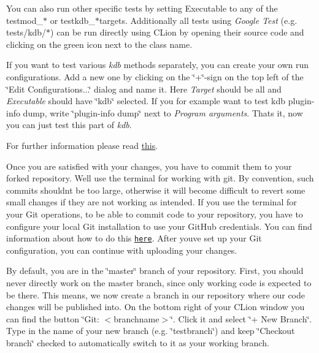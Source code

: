 You can also run other specific tests by setting {\ttfamily Executable} to any of the {\ttfamily testmod\+\_\+$\ast$} or {\ttfamily testkdb\+\_\+$\ast$}targets. Additionally all tests using {\itshape Google Test} (e.\+g. tests/kdb/$\ast$) can be run directly using C\+Lion by opening their source code and clicking on the green icon next to the class name.

If you want to test various {\itshape kdb} methods separately, you can create your own run configurations. Add a new one by clicking on the \char`\"{}+\char`\"{}-\/sign on the top left of the \char`\"{}\+Edit Configurations...\char`\"{} dialog and name it. Here {\itshape Target} should be {\ttfamily all} and {\itshape Executable} should have \char`\"{}kdb\char`\"{} selected. If you for example want to test {\ttfamily kdb plugin-\/info dump}, write \char`\"{}plugin-\/info dump\char`\"{} next to {\itshape Program arguments}. That\textquotesingle{}s it, now you can just test this part of {\itshape kdb}.

For further information please read \hyperlink{doc_TESTING_md}{this}.

Once you are satisfied with your changes, you have to commit them to your forked repository. We\textquotesingle{}ll use the terminal for working with git. By convention, such commits shouldn\textquotesingle{}t be too large, otherwise it will become difficult to revert some small changes if they are not working as intended. If you use the terminal for your Git operations, to be able to commit code to your repository, you have to configure your local Git installation to use your Git\+Hub credentials. You can find information about how to do this \href{https://help.github.com/en/articles/set-up-git}{\tt here}. After you\textquotesingle{}ve set up your Git configuration, you can continue with uploading your changes.

By default, you are in the \char`\"{}master\char`\"{} branch of your repository. First, you should never directly work on the master branch, since only working code is expected to be there. This means, we now create a branch in our repository where our code changes will be published into. On the bottom right of your C\+Lion window you can find the button \char`\"{}\+Git\+: $<$branchname$>$\char`\"{}. Click it and select \char`\"{}+ New Branch\char`\"{}. Type in the name of your new branch (e.\+g. \char`\"{}testbranch\char`\"{}) and keep \char`\"{}\+Checkout branch\char`\"{} checked to automatically switch to it as your working branch.

